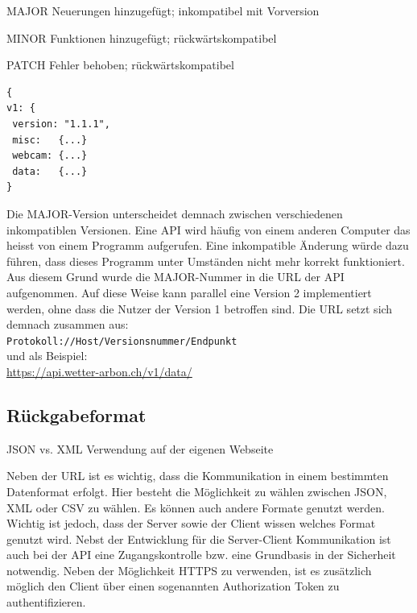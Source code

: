 \begin{description*}
  \item[MAJOR] Neuerungen hinzugefügt; inkompatibel mit Vorversion
  \item[MINOR] Funktionen hinzugefügt; rückwärtskompatibel
  \item[PATCH] Fehler behoben; rückwärtskompatibel
\end{description*}

\vspace{3mm}
\begin{lstlisting}[label=lst:versionierung,caption=Versionierungsangabe auf der obersten Hierarchiestufe, language=HTML5, style=php]
{
v1: {
 version: "1.1.1",
 misc:   {...}
 webcam: {...}
 data:   {...}
}
\end{lstlisting}
\vspace{3mm}

\noindent
Die MAJOR-Version unterscheidet demnach zwischen verschiedenen inkompatiblen Versionen. Eine API wird häufig von einem anderen Computer das heisst von einem Programm aufgerufen. Eine inkompatible Änderung würde dazu führen, dass dieses Programm unter Umständen nicht mehr korrekt funktioniert. Aus diesem Grund wurde die MAJOR-Nummer in die URL der API aufgenommen. Auf diese Weise kann parallel eine Version 2 implementiert werden, ohne dass die Nutzer der Version 1 betroffen sind. Die URL setzt sich demnach zusammen aus: \\

\noindent
\texttt{Protokoll://Host/Versionsnummer/Endpunkt}\\
und als Beispiel:\\
\url{https://api.wetter-arbon.ch/v1/data/}

\noindent
{}



\subsection{Rückgabeformat}
JSON vs. XML
Verwendung auf der eigenen Webseite

 Neben der URL ist es wichtig, dass die Kommunikation in einem bestimmten Datenformat erfolgt. Hier besteht die Möglichkeit zu wählen zwischen JSON, XML oder CSV zu wählen. Es können auch andere Formate genutzt werden. Wichtig ist jedoch, dass der Server sowie der Client wissen welches Format genutzt wird. Nebst der Entwicklung für die Server-Client Kommunikation ist auch bei der API eine Zugangskontrolle bzw. eine Grundbasis in der Sicherheit notwendig. Neben der Möglichkeit HTTPS zu verwenden, ist es zusätzlich möglich den Client über einen sogenannten Authorization Token zu authentifizieren.\\

